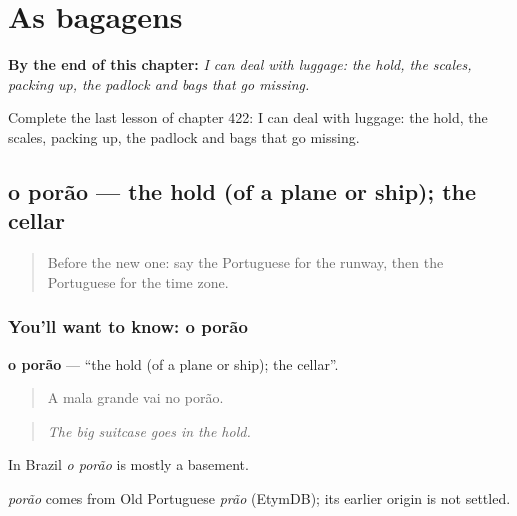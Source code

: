 
\chapter{As bagagens}
\label{ch:pt-as-bagagens}

\begin{chapteropening}
\textbf{By the end of this chapter:} \emph{I can deal with luggage: the hold, the scales, packing up, the padlock and bags that go missing.}

Complete the last lesson of chapter 422: I can deal with luggage: the hold, the scales, packing up, the padlock and bags that go missing.
\end{chapteropening}

\section[o porão]{o porão — the hold (of a plane or ship); the cellar}

\label{lesson:PT-C422-porao}



\begin{quote}
Before the new one: say the Portuguese for the runway, then the Portuguese for the time zone.
\end{quote}

\subsection*{You'll want to know: o porão}
\textbf{o porão} — \textquotedblleft{}the hold (of a plane or ship); the cellar\textquotedblright{}.

\begin{quote}
A mala grande vai no porão.
\end{quote}

\begin{quote}
\emph{The big suitcase goes in the hold.}
\end{quote}

In Brazil \emph{o porão} is mostly a basement.

\begin{cousinweb}
\emph{porão} comes from Old Portuguese \emph{prão} (EtymDB); its earlier origin is not settled.
\end{cousinweb}

